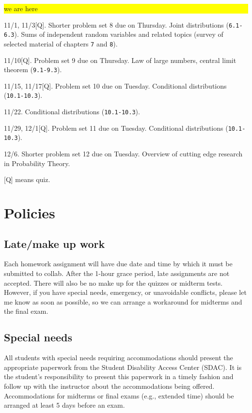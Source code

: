 \documentclass[oneside,11pt]{amsart}
\begin{document}
\begin{enumerate}[\bf{}{[}week 1{]}]
		\colorbox{yellow}{\parbox{.7\textwidth}{we are here}}
		
	\item 11/1, 11/3[Q].
		Shorter problem set 8 due on Thursday.
		Joint distributions (\texttt{6.1-6.3}).
		Sums of independent random variables and related topics (survey of 
		selected material of chapters \texttt{7} and \texttt{8}).
	\item 11/10[Q].
		Problem set 9 due on Thursday.
		Law of large numbers, central limit theorem (\texttt{9.1-9.3}).
	\item 11/15, 11/17[Q].
		Problem set 10 due on Tuesday.
		Conditional distributions (\texttt{10.1-10.3}).
	\item 11/22.
		Conditional distributions (\texttt{10.1-10.3}).
	\item 11/29, 12/1[Q].
		Problem set 11 due on Tuesday.
		Conditional distributions (\texttt{10.1-10.3}).
	\item 12/6.
		Shorter problem set 12 due on Tuesday.
		Overview of cutting edge research in Probability Theory.
\end{enumerate}

[Q] means quiz.

\section{Policies}

\subsection{Late/make up work} Each homework
assignment will have due date and time by which it must be submitted to collab.
After the 1-hour grace period, late assignments are not accepted.
There will also be no make up for the quizzes or midterm tests.
However, if you have special needs, emergency, or unavoidable conflicts, please
let me know as soon as possible, so we can arrange a workaround for midterms and the final exam.

\subsection{Special needs}

All students with special needs requiring accommodations should present the
appropriate paperwork from the Student Disability Access Center (SDAC). It is
the student's responsibility to present this paperwork in a timely fashion and
follow up with the instructor about the accommodations being offered.
Accommodations for midterms or final exams (e.g., extended time) should be arranged at
least 5 days before an exam.
\end{document}
